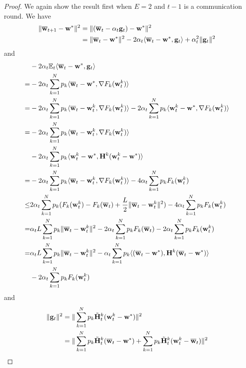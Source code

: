\begin{proof}
	We again show the result first when $E=2$ and $t-1$ is a communication
	round. We have 
	\begin{align*}
	\|{\overline{\mathbf{w}}}_{t+1}-{\mathbf{w}}^{\ast}\|^{2} & =\|({\overline{\mathbf{w}}}_{t}-\alpha_{t}{\mathbf{g}}_{t})-{\mathbf{w}}^{\ast}\|^{2}\\
	& =\|{\overline{\mathbf{w}}}_{t}-{\mathbf{w}}^{\ast}\|^{2}-2\alpha_{t}\langle{\overline{\mathbf{w}}}_{t}-{\mathbf{w}}^{\ast},{\mathbf{g}}_{t}\rangle+\alpha_{t}^{2}\|{\mathbf{g}}_{t}\|^{2}
	\end{align*}
	and 
	\begin{align*}
	& -2\alpha_{t}\mathbb{E}_{t}\langle{\overline{\mathbf{w}}}_{t}-{\mathbf{w}}^{\ast},{\mathbf{g}}_{t}\rangle\\
	=&-2\alpha_{t}\sum_{k=1}^{N}p_{k}\langle{\overline{\mathbf{w}}}_{t}-{\mathbf{w}}^{\ast},\nabla F_{k}({\mathbf{w}}_{t}^{k})\rangle\\
	=& -2\alpha_{t}\sum_{k=1}^{N}p_{k}\langle{\overline{\mathbf{w}}}_{t}-{\mathbf{w}}_{t}^{k},\nabla F_{k}({\mathbf{w}}_{t}^{k})\rangle  -2\alpha_{t}\sum_{k=1}^{N}p_{k}\langle {\mathbf{w}}_{t}^{k}-{\mathbf{w}}^{\ast},\nabla F_{k}({\mathbf{w}}_{t}^{k})\rangle\\
	=&-2\alpha_{t}\sum_{k=1}^{N}p_{k}\langle{\overline{\mathbf{w}}}_{t}-{\mathbf{w}}_{t}^{k},\nabla F_{k}({\mathbf{w}}_{t}^{k})\rangle\\
	& -2\alpha_{t}\sum_{k=1}^{N}p_{k}\langle {\mathbf{w}}_{t}^{k}-{\mathbf{w}}^{\ast},{\mathbf{H}}^{k}({\mathbf{w}}_{t}^{k}-{\mathbf{w}}^{\ast})\rangle\\
	=&-2\alpha_{t}\sum_{k=1}^{N}p_{k}\langle{\overline{\mathbf{w}}}_{t}-{\mathbf{w}}_{t}^{k},\nabla F_{k}({\mathbf{w}}_{t}^{k})\rangle -4\alpha_{t}\sum_{k=1}^{N}p_{k}F_{k}({\mathbf{w}}_{t}^{k})\\
	\leq & 2\alpha_{t}\sum_{k=1}^{N}p_{k}(F_{k}({\mathbf{w}}_{t}^{k})-F_{k}({\overline{\mathbf{w}}}_{t})+\frac{L}{2}\|{\overline{\mathbf{w}}}_{t}-{\mathbf{w}}_{t}^{k}\|^{2}) -4\alpha_{t}\sum_{k=1}^{N}p_{k}F_{k}({\mathbf{w}}_{t}^{k})\\
	=&\alpha_{t}L\sum_{k=1}^{N}p_{k}\|{\overline{\mathbf{w}}}_{t}-{\mathbf{w}}_{t}^{k}\|^{2}-2\alpha_{t}\sum_{k=1}^{N}p_{k}F_{k}({\overline{\mathbf{w}}}_{t})-2\alpha_{t}\sum_{k=1}^{N}p_{k}F_{k}({\mathbf{w}}_{t}^{k})\\
	=&\alpha_{t}L\sum_{k=1}^{N}p_{k}\|{\overline{\mathbf{w}}}_{t}-{\mathbf{w}}_{t}^{k}\|^{2}-\alpha_{t}\sum_{k=1}^{N}p_{k}\langle({\overline{\mathbf{w}}}_{t}-{\mathbf{w}}^{\ast}),{\mathbf{H}}^{k}({\overline{\mathbf{w}}}_{t}-{\mathbf{w}}^{\ast})\rangle\\
	& -2\alpha_{t}\sum_{k=1}^{N}p_{k}F_{k}({\mathbf{w}}_{t}^{k})
	\end{align*}
	and 
	\begin{align*}
	\|\vg_{t}\|^{2} & =\|\sum_{k=1}^{N}p_{k}\tilde{\vH}_{t}^{k}(\vw_{t}^{k}-\vw^{\ast})\|^{2}\\
	& =\|\sum_{k=1}^{N}p_{k}\tilde{\vH}_{t}^{k}(\ov{w}_{t}-\vw^{\ast})+\sum_{k=1}^{N}p_{k}\tilde{\vH}_{t}^{k}(\vw_{t}^{k}-\ov{w}_{t})\|^{2}\\

\end{align*}
\end{proof}
